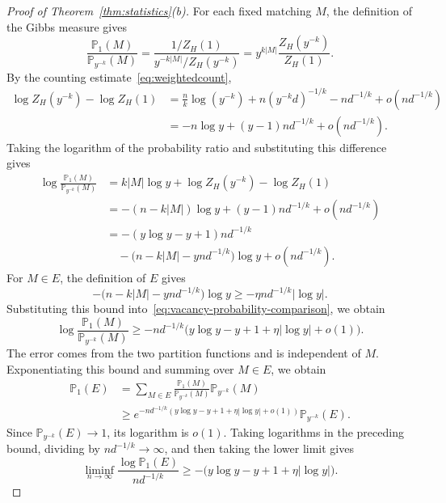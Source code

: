 \documentclass[11pt,reqno]{amsart}
\numberwithin{equation}{section}
\theoremstyle{plain}
\theoremstyle{definition}
\newcommand{\Prob}{\mathbb P}
\begin{document}
\begin{proof}[Proof of Theorem~\ref{thm:statistics}(b)]
    For each fixed matching $M$, the definition of the Gibbs measure gives
    \[
        \frac{\Prob_1(M)}{\Prob_{y^{-k}}(M)}
        =\frac{1/Z_H(1)}{y^{-k|M|}/Z_H(y^{-k})}
        =y^{k|M|}\frac{Z_H(y^{-k})}{Z_H(1)}.
    \]
    By the counting estimate~\eqref{eq:weightedcount},
    \[
        \begin{aligned}
            \log Z_H(y^{-k})-\log Z_H(1)
            &=\frac nk\log(y^{-k})+n(y^{-k}d)^{-1/k}-nd^{-1/k}+o(nd^{-1/k})\\
            &=-n\log y+(y-1)nd^{-1/k}+o(nd^{-1/k}).
        \end{aligned}
    \]
    Taking the logarithm of the probability ratio and substituting this difference gives
    \begin{equation}\label{eq:vacancy-probability-comparison}
        \begin{aligned}
            \log\frac{\Prob_1(M)}{\Prob_{y^{-k}}(M)}
            &=k|M|\log y+\log Z_H(y^{-k})-\log Z_H(1)\\
            &=-(n-k|M|)\log y+(y-1)nd^{-1/k}+o(nd^{-1/k})\\
            &=-(y\log y-y+1)nd^{-1/k}\\
            &\quad-\bigl(n-k|M|-ynd^{-1/k}\bigr)\log y+o(nd^{-1/k}).
        \end{aligned}
    \end{equation}
    For $M\in E$, the definition of $E$ gives
    \[
        -\bigl(n-k|M|-ynd^{-1/k}\bigr)\log y
        \ge-\eta nd^{-1/k}|\log y|.
    \]
    Substituting this bound into~\eqref{eq:vacancy-probability-comparison}, we obtain
    \[
        \log\frac{\Prob_1(M)}{\Prob_{y^{-k}}(M)}
        \ge-nd^{-1/k}\bigl(y\log y-y+1+\eta|\log y|+o(1)\bigr).
    \]
    The error comes from the two partition functions and is independent of $M$.
    Exponentiating this bound and summing over $M\in E$, we obtain
    \[
        \begin{aligned}
            \Prob_1(E)
            &=\sum_{M\in E}\frac{\Prob_1(M)}{\Prob_{y^{-k}}(M)}\Prob_{y^{-k}}(M)\\
            &\ge e^{-nd^{-1/k}(y\log y-y+1+\eta|\log y|+o(1))}
            \Prob_{y^{-k}}(E).
        \end{aligned}
    \]
    Since $\Prob_{y^{-k}}(E)\to1$, its logarithm is $o(1)$.
    Taking logarithms in the preceding bound, dividing by $nd^{-1/k}\to\infty$, and then taking the lower limit gives
    \begin{equation}\label{eq:vacancy-event-lower}
        \liminf_{n\to\infty}\frac{\log\Prob_1(E)}{nd^{-1/k}}
        \ge-\bigl(y\log y-y+1+\eta|\log y|\bigr).
    \end{equation}


\end{proof}
\end{document}
